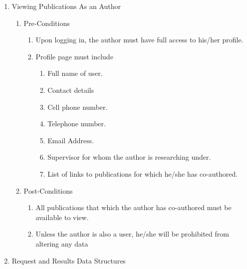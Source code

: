 \documentclass[hidelinks,a4paper,12pt]{article}
\begin{document}
	\begin{enumerate}
		\item  Viewing Publications As an Author
		
		\begin{enumerate}
			\item  Pre-Conditions
			
			\begin{enumerate}
				\item  Upon logging in, the author must have full access to his/her profile.
				
				\item  Profile page must include
				
				\begin{enumerate}
					\item  Full name of user.
					
					\item  Contact details
					
					\item  Cell phone number.
					
					\item  Telephone number.
					
					\item  Email Address.
					
					\item  Supervisor for whom the author is researching under.
					
					\item  List of links to publications for which he/she has co-authored.
				\end{enumerate}
			\end{enumerate}
			
			\item  Post-Conditions
			
			\begin{enumerate}
				\item  All publications that which the author has co-authored must be available to view.
				
				\item  Unless the author is also a user, he/she will be prohibited from altering any data  
			\end{enumerate}
		\end{enumerate}
		
		\item  Request and Results Data Structures
	\end{enumerate}
	
\end{document}
